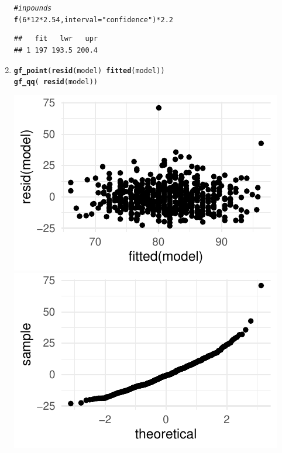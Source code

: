 \documentclass[twoside]{book}\usepackage[]{graphicx}\usepackage[]{xcolor}
\makeatletter
\def\maxwidth{ %
  \ifdim\Gin@nat@width>\linewidth
    \linewidth
  \else
    \Gin@nat@width
  \fi
}
\newcommand{\hlnum}[1]{\textcolor[rgb]{0.686,0.059,0.569}{#1}}%
\newcommand{\hlstr}[1]{\textcolor[rgb]{0.192,0.494,0.8}{#1}}%
\newcommand{\hlcom}[1]{\textcolor[rgb]{0.678,0.584,0.686}{\textit{#1}}}%
\newcommand{\hlopt}[1]{\textcolor[rgb]{0,0,0}{#1}}%
\newcommand{\hlstd}[1]{\textcolor[rgb]{0.345,0.345,0.345}{#1}}%
\newcommand{\hlkwc}[1]{\textcolor[rgb]{0.333,0.667,0.333}{#1}}%
\newcommand{\hlkwd}[1]{\textcolor[rgb]{0.737,0.353,0.396}{\textbf{#1}}}%
\newenvironment{kframe}{%
 \def\at@end@of@kframe{}%
 \ifinner\ifhmode%
  \def\at@end@of@kframe{\end{minipage}}%
  \begin{minipage}{\columnwidth}%
 \fi\fi%
 \def\FrameCommand##1{\hskip\@totalleftmargin \hskip-\fboxsep
 \colorbox{shadecolor}{##1}\hskip-\fboxsep
     \hskip-\linewidth \hskip-\@totalleftmargin \hskip\columnwidth}%
 \MakeFramed {\advance\hsize-\width
   \@totalleftmargin\z@ \linewidth\hsize
   \@setminipage}}%
 {\par\unskip\endMakeFramed%
 \at@end@of@kframe}
\newenvironment{knitrout}{}{} %
\makeatother
\begin{document}
\begin{solution}
\begin{enumerate}
\begin{knitrout}
\begin{kframe}
\begin{verbatim}
\end{verbatim}
\begin{alltt}
\hlcom{# in pounds}
\hlkwd{f}\hlstd{(}\hlnum{6} \hlopt{*} \hlnum{12} \hlopt{*} \hlnum{2.54}\hlstd{,} \hlkwc{interval} \hlstd{=} \hlstr{"confidence"}\hlstd{)} \hlopt{*} \hlnum{2.2}
\end{alltt}
\begin{verbatim}
##   fit   lwr   upr
## 1 197 193.5 200.4
\end{verbatim}
\end{kframe}
\end{knitrout}
		\item
\begin{knitrout}
\color{fgcolor}\begin{kframe}
\begin{alltt}
\hlkwd{gf_point}\hlstd{(}\hlkwd{resid}\hlstd{(model)} \hlopt{~} \hlkwd{fitted}\hlstd{(model))}
\hlkwd{gf_qq}\hlstd{(} \hlopt{~} \hlkwd{resid}\hlstd{(model))}
\end{alltt}
\end{kframe}

{\centering \includegraphics[width=\maxwidth]{figures/fig-unnamed-chunk-235-1} 
\includegraphics[width=\maxwidth]{figures/fig-unnamed-chunk-235-2} 

}
\end{knitrout}
\end{enumerate}
\end{solution}
\end{document}
